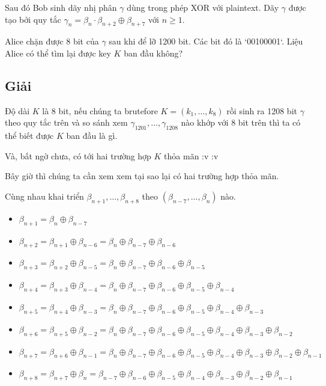 Sau đó Bob sinh dãy nhị phân $\gamma$ dùng trong phép XOR với plaintext. Dãy $\gamma$ được tạo bởi quy tắc $\gamma_n = \beta_n \cdot \beta_{n+2} \oplus \beta_{n+7}$ với $n \geqslant 1$.

Alice chặn được 8 bit của $\gamma$ sau khi để lỡ 1200 bit. Các bit đó là `00100001`. Liệu Alice có thể tìm lại được key $K$ ban đầu không?

\subsection*{Giải}

Độ dài $K$ là 8 bit, nếu chúng ta brutefore $K = (k_1, \ldots, k_8)$ rồi sinh ra 1208 bit $\gamma$ theo quy tắc trên và so sánh xem $\gamma_{1201}, \ldots, \gamma_{1208}$ nào khớp với 8 bit trên thì ta có thể biết được $K$ ban đầu là gì.

Và, bất ngờ chưa, có tới hai trường hợp $K$ thỏa mãn :v :v

Bây giờ thì chúng ta cần xem xem tại sao lại có hai trường hợp thỏa mãn.

Cùng nhau khai triển $\beta_{n+1}, \ldots, \beta_{n+8}$ theo $(\beta_{n-7}, \ldots, \beta_n)$ nào.

\begin{itemize}
    \item $\beta_{n+1} = \beta_{n} \oplus \beta_{n-7}$
    \item $\beta_{n+2} = \beta_{n+1} \oplus \beta_{n-6} = \beta_n \oplus \beta_{n-7} \oplus \beta_{n-6}$
    \item $\beta_{n+3} = \beta_{n+2} \oplus \beta_{n-5} = \beta_n \oplus \beta_{n-7} \oplus \beta_{n-6} \oplus \beta_{n-5}$
    \item $\beta_{n+4} = \beta_{n+3} \oplus \beta_{n-4} = \beta_n \oplus \beta_{n-7} \oplus \beta_{n-6} \oplus \beta_{n-5} \oplus \beta_{n-4}$
    \item $\beta_{n+5} = \beta_{n+4} \oplus \beta_{n-3} = \beta_n \oplus \beta_{n-7} \oplus \beta_{n-6} \oplus \beta_{n-5} \oplus \beta_{n-4} \oplus \beta_{n-3}$
    \item $\beta_{n+6} = \beta_{n+5} \oplus \beta_{n-2} = \beta_n \oplus \beta_{n-7} \oplus \beta_{n-6} \oplus \beta_{n-5} \oplus \beta_{n-4} \oplus \beta_{n-3} \oplus \beta_{n-2}$
    \item $\beta_{n+7} = \beta_{n+6} \oplus \beta_{n-1} = \beta_n \oplus \beta_{n-7} \oplus \beta_{n-6} \oplus \beta_{n-5} \oplus \beta_{n-4} \oplus \beta_{n-3} \oplus \beta_{n-2} \oplus \beta_{n-1}$
    \item $\beta_{n+8} = \beta_{n+7} \oplus \beta_n = \beta_{n-7} \oplus \beta_{n-6} \oplus \beta_{n-5} \oplus \beta_{n-4} \oplus \beta_{n-3} \oplus \beta_{n-2} \oplus \beta_{n-1}$
\end{itemize}

